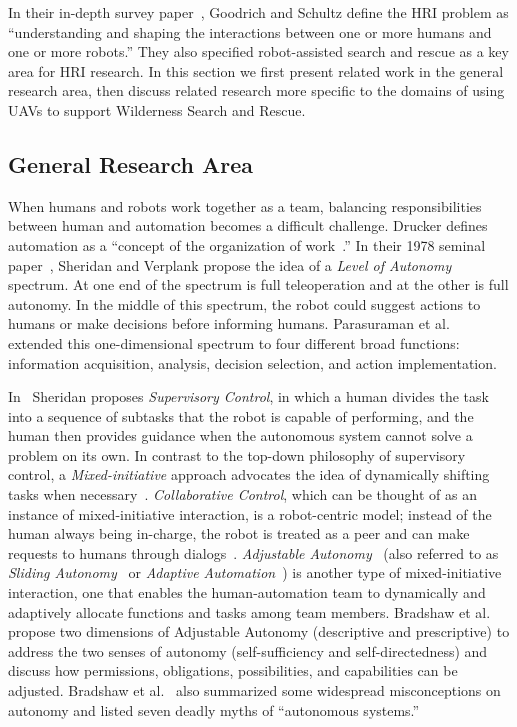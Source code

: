 In their in-depth survey paper~\cite{Goodrich2007HRISurvey}, Goodrich and Schultz define the HRI problem as ``understanding and shaping the interactions between one or more humans and one or more robots.'' They also specified robot-assisted search and rescue as a key area for HRI research. In this section we first present related work in the general research area, then discuss related research more specific to the domains of using UAVs to support Wilderness Search and Rescue.

\subsection{General Research Area}

When humans and robots work together as a team, balancing responsibilities between human and automation becomes a difficult challenge. Drucker defines automation as a ``concept of the organization of work~\cite{Drucker2006Practice}.'' In their 1978 seminal paper~\cite{Sheridan1978Human}, Sheridan and Verplank propose the idea of a \textit{Level of Autonomy} spectrum. At one end of the spectrum is full teleoperation and at the other is full autonomy. In the middle of this spectrum, the robot could suggest actions to humans or make decisions before informing humans. Parasuraman et al.\ \cite{Parasuraman2000Model} extended this one-dimensional spectrum to four different broad functions: information acquisition, analysis, decision selection, and action implementation. 

In~\cite{Sheridan1992Telerobotics} Sheridan proposes \textit{Supervisory Control}, in which a human divides the task into a sequence of subtasks that the robot is capable of performing, and the human then provides guidance when the autonomous system cannot solve a problem on its own. In contrast to the top-down philosophy of supervisory control, a \textit{Mixed-initiative} approach advocates the idea of dynamically shifting tasks when necessary~\cite{Hearst1999Mixed}. \textit{Collaborative Control}, which can be thought of as an instance of mixed-initiative interaction, is a robot-centric model; instead of the human always being in-charge, the robot is treated as a peer and can make requests to humans through dialogs~\cite{Fong1999Collaborative}. \textit{Adjustable Autonomy}~\cite{Dorais2001Designing} (also referred to as \textit{Sliding Autonomy}~\cite{Dias2008SlidingAutonomy} or \textit{Adaptive Automation}~\cite{Rouse1988Adaptive}) is another type of mixed-initiative interaction, one that enables the human-automation team to dynamically and adaptively allocate functions and tasks among team members. Bradshaw et al.\ \cite{Bradshaw2004Dimensions} propose two dimensions of Adjustable Autonomy (descriptive  and prescriptive) to address the two senses of autonomy (self-sufficiency and self-directedness) and discuss how permissions, obligations, possibilities, and capabilities can be adjusted. Bradshaw et al.\ \cite{Bradshaw2013Seven} also summarized some widespread misconceptions on autonomy and listed seven deadly myths of ``autonomous systems.''


